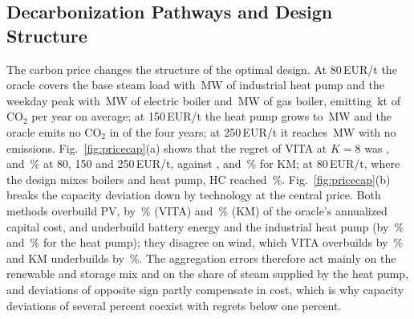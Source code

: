 \documentclass[journal]{IEEEtran}
\begin{document}
\subsection{Decarbonization Pathways and Design Structure}
The carbon price changes the structure of the optimal design. At 80\,EUR/t the oracle covers the base steam load with \OracleQHEighty\,MW of industrial heat pump and the weekday peak with \OracleQebEighty\,MW of electric boiler and \OracleQgbEighty\,MW of gas boiler, emitting \OracleCOEighty\,kt of CO$_2$ per year on average; at 150\,EUR/t the heat pump grows to \OracleQHOneFifty\,MW and the oracle emits no CO$_2$ in \OracleNoCOOneFifty{} of the four years; at 250\,EUR/t it reaches \OracleQHTwoFifty\,MW with no emissions. Fig.~\ref{fig:pricecap}(a) shows that the regret of VITA at $K=8$ was \RegVITAKeightEighty, \RegVITAKeightOneFifty{} and \RegVITAKeightTwoFifty\,\% at 80, 150 and 250\,EUR/t, against \RegKMKeightEighty, \RegKMKeightOneFifty{} and \RegKMKeightTwoFifty\,\% for KM; at 80\,EUR/t, where the design mixes boilers and heat pump, HC reached \RegHCKeightEighty\,\%. Fig.~\ref{fig:pricecap}(b) breaks the capacity deviation down by technology at the central price. Both methods overbuild PV, by \CapDevPVVITA\,\% (VITA) and \CapDevPVBase\,\% (KM) of the oracle's annualized capital cost, and underbuild battery energy and the industrial heat pump (by \CapDevQHVITA\,\% and \CapDevQHBase\,\% for the heat pump); they disagree on wind, which VITA overbuilds by \CapDevWindVITA\,\% and KM underbuilds by \CapDevWindBase\,\%. The aggregation errors therefore act mainly on the renewable and storage mix and on the share of steam supplied by the heat pump, and deviations of opposite sign partly compensate in cost, which is why capacity deviations of several percent coexist with regrets below one percent.


\end{document}
